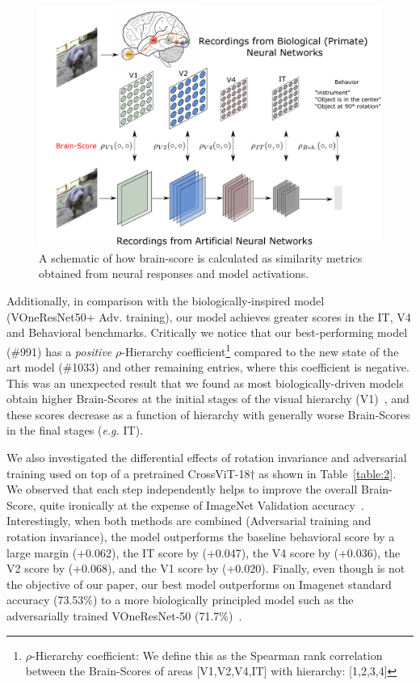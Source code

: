 \documentclass{article} %
\begin{document}
\begin{figure}
\centering
\includegraphics[scale=0.24]{src/Brain-Score-Figure.pdf}
\caption{A schematic of how brain-score is calculated as similarity metrics obtained from neural responses and model activations.}
\label{fig:schmatic}
\end{figure}Additionally, in comparison with the  biologically-inspired model (VOneResNet50+  Adv. training), our model achieves greater scores in the IT, V4 and Behavioral benchmarks. Critically we notice that our best-performing model (\#991) has a \textit{positive} $\rho$-Hierarchy coefficient\footnote{$\rho$-Hierarchy coefficient: We define this as the Spearman rank correlation between the Brain-Scores of areas [V1,V2,V4,IT] with hierarchy: [1,2,3,4]} compared to the new state of the art model (\#1033) and other remaining entries, where this coefficient is negative. This was an unexpected result that we found as most biologically-driven models obtain higher Brain-Scores at the initial stages of the visual hierarchy (V1)~\citep{dapello2020simulating}, and these scores decrease as a function of hierarchy with generally worse Brain-Scores in the final stages (\textit{e.g.} IT). 

We also investigated the differential effects of rotation invariance and adversarial training used on top of a pretrained CrossViT-18$\dagger$ as shown in Table~\ref{table:2}. We observed that each step independently helps to improve the overall Brain-Score, quite ironically at the expense of ImageNet Validation accuracy~\citep{zhang2019theoretically}. Interestingly, when both methods are combined (Adversarial training and rotation invariance), the model outperforms the baseline behavioral score by a large margin (+0.062), the IT score by (+0.047), the V4 score by (+0.036), the V2 score by (+0.068), and the V1 score by (+0.020). Finally, even though is not the objective of our paper, our best model outperforms on Imagenet standard accuracy (73.53\%) to a more biologically principled model such as the adversarially trained VOneResNet-50 (71.7\%)~\citep{dapello2020simulating}.
\end{document}
